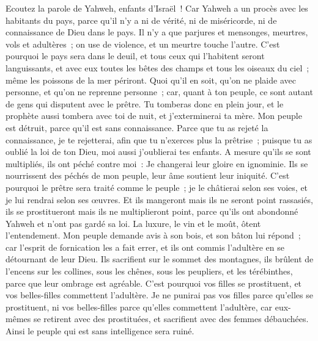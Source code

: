 \begin{multicols}{2}
\VerseOne{}Ecoutez la parole de Yahweh, enfants d'Israël~! Car Yahweh a un procès avec les habitants du pays, parce qu'il n'y a ni de vérité, ni de miséricorde, ni de connaissance de Dieu dans le pays.
Il n'y a que parjures et mensonges, meurtres, vols et adultères~; on use de violence, et un meurtre touche l'autre.
C'est pourquoi le pays sera dans le deuil, et tous ceux qui l'habitent seront languissants, et avec eux toutes les bêtes des champs et tous les oiseaux du ciel~; même les poissons de la mer périront.
Quoi qu'il en soit, qu'on ne plaide avec personne, et qu'on ne reprenne personne~; car, quant à ton peuple, ce sont autant de gens qui disputent avec le prêtre.
Tu tomberas donc en plein jour, et le prophète aussi tombera avec toi de nuit, et j'exterminerai ta mère.
Mon peuple est détruit, parce qu'il est sans connaissance. Parce que tu as rejeté la connaissance, je te rejetterai, afin que tu n'exerces plus la prêtrise~; puisque tu as oublié la loi de ton Dieu, moi aussi j'oublierai tes enfants.
A mesure qu'ils se sont multipliés, ils ont péché contre moi~: Je changerai leur gloire en ignominie.
Ils se nourrissent des péchés de mon peuple, leur âme soutient leur iniquité.
C'est pourquoi le prêtre sera traité comme le peuple~; je le châtierai selon ses voies, et je lui rendrai selon ses œuvres.
Et ils mangeront mais ils ne seront point rassasiés, ils se prostitueront mais ils ne multiplieront point, parce qu'ils ont abondonné Yahweh et n'ont pas gardé sa loi.
La luxure, le vin et le moût, ôtent l'entendement.
Mon peuple demande avis à son bois, et son bâton lui répond~; car l'esprit de fornication les a fait errer, et ils ont commis l'adultère en se détournant de leur Dieu.
Ils sacrifient sur le sommet des montagnes, ils brûlent de l'encens sur les collines, sous les chênes, sous les peupliers, et les térébinthes, parce que leur ombrage est agréable. C'est pourquoi vos filles se prostituent, et vos belles-filles commettent l'adultère.
Je ne punirai pas vos filles parce qu'elles se prostituent, ni vos belles-filles parce qu'elles commettent l'adultère, car eux-mêmes se retirent avec des prostituées, et sacrifient avec des femmes débauchées. Ainsi le peuple qui est sans intelligence sera ruiné.

\end{multicols}
